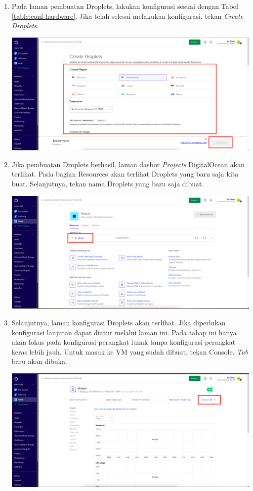 \begin{enumerate}
\begin{center}
	\end{center} 
  \item Pada laman pembuatan Droplets, lakukan konfigurasi sesuai dengan Tabel \ref{table:conf-hardware}. Jika telah selesai melakukan konfigurasi, tekan \textit{Create Droplets}. 
	\begin{center}
	\includegraphics[width=1\linewidth]{figures/ch99/ap1/3.png}
	\end{center} 
  \item Jika pembuatan Droplets berhasil, laman dasbor \textit{Projects} DigitalOcean akan terlihat. Pada bagian Resources akan terlihat Droplets yang baru saja kita buat. Selanjutnya, tekan nama Droplets yang baru saja dibuat. 
	\begin{center}
	\includegraphics[width=1\linewidth]{figures/ch99/ap1/4.png}
	\end{center} 
  \item Selanjutnya, laman konfigurasi Droplets akan terlihat. Jika diperlukan konfigurasi lanjutan dapat diatur melalui laman ini. Pada tahap ini hanya akan fokus pada konfigurasi perangkat lunak tanpa konfigurasi perangkat keras lebih jauh. Untuk masuk ke VM yang sudah dibuat, tekan Console. \textit{Tab} baru akan dibuka.
	\begin{center}
	\includegraphics[width=1\linewidth]{figures/ch99/ap1/5.png}

\end{center}
\end{enumerate}
